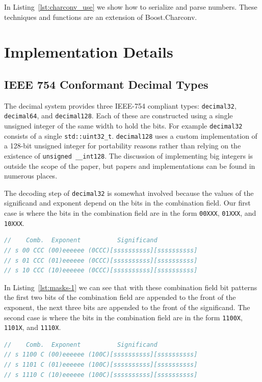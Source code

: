 \documentclass[acmsmall]{acmart}
\newcommand{\code}[1]{\texttt{#1}}
\begin{document}
In Listing~\ref{lst:charconv_use} we show how to serialize and parse numbers.
These techniques and functions are an extension of Boost.Charconv\cite{charconv}.

\section{Implementation Details}

\subsection{IEEE 754 Conformant Decimal Types}

The decimal system provides three IEEE-754 compliant types: \code{decimal32}, \code{decimal64}, and \code{decimal128}.
Each of these are constructed using a single unsigned integer of the same width to hold the bits.
For example \code{decimal32} consists of a single \code{std::uint32\_t}.
\code{decimal128} uses a custom implementation of a 128-bit unsigned integer for portability reasons rather than relying on the existence of \code{unsigned \_\_int128}.
The discussion of implementing big integers is outside the scope of the paper, but papers and implementations can be found in numerous places\cite{charconv}\cite{lemire2021number}\cite{knuth}.

The decoding step of \code{decimal32} is somewhat involved because the values of the significand and exponent depend on the bits in the combination field.
Our first case is where the bits in the combination field are in the form \code{00XXX}, \code{01XXX}, and \code{10XXX}.

\begin{lstlisting}[language=C++, caption={Combination Field Pattern 1}, label={lst:masks-1}]
//    Comb.  Exponent          Significand
// s 00 CCC (00)eeeeee (0CCC)[ssssssssss][ssssssssss]
// s 01 CCC (01)eeeeee (0CCC)[ssssssssss][ssssssssss]
// s 10 CCC (10)eeeeee (0CCC)[ssssssssss][ssssssssss]
\end{lstlisting}

In Listing~\ref{lst:masks-1} we can see that with these combination field bit patterns the first two bits of the combination field are appended to the front of the exponent,
the next three bits are appended to the front of the significand.
The second case is where the bits in the combination field are in the form \code{1100X}, \code{1101X}, and \code{1110X}.

\begin{lstlisting}[language=C++, caption={Combination Field Pattern 2}, label={lst:masks-2}]
//    Comb.  Exponent          Significand
// s 1100 C (00)eeeeee (100C)[ssssssssss][ssssssssss]
// s 1101 C (01)eeeeee (100C)[ssssssssss][ssssssssss]
// s 1110 C (10)eeeeee (100C)[ssssssssss][ssssssssss]
\end{lstlisting}
\end{document}
